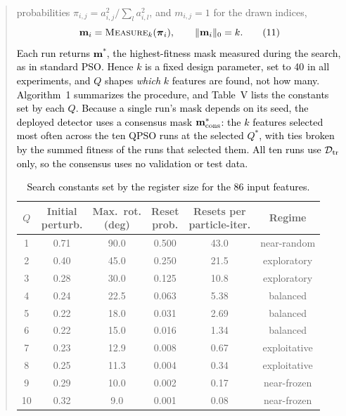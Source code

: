 \documentclass[11pt]{article}
\newenvironment{excerpt}{\begin{quote}\sloppy}{\end{quote}}
\begin{document}
\begin{excerpt}
{probabilities $\pi_{i,j}=a_{i,j}^{2}/\sum_{l}a_{i,l}^{2}$, and
$m_{i,j}=1$ for the drawn indices,}
\begin{equation}
\textcolor{black}{\mathbf{m}_i = \textsc{Measure}_k(\boldsymbol{\pi}_i),
\qquad \|\mathbf{m}_i\|_0 = k .}
\tag{11}
\end{equation}
\textcolor{black}{Each run returns $\mathbf{m}^{*}$, the
highest-fitness mask measured during the search, as in standard PSO.
Hence $k$ is a fixed design parameter, set to 40 in all experiments,
and $Q$ shapes \emph{which} $k$ features are found, not how many.
Algorithm~1 summarizes the procedure, and
Table~V lists the constants set by each $Q$.}
\textcolor{black}{Because a single run's mask depends on its
seed, the deployed detector uses a consensus mask
$\mathbf{m}^{*}_{\rm cons}$: the $k$ features selected most often
across the ten QPSO runs at the selected $Q^{*}$, with ties broken by
the summed fitness of the runs that selected them. All ten runs use
$\mathcal{D}_{\rm tr}$ only, so the consensus uses no validation or
test data.}

\setcounter{table}{4}
\begin{table}[H]
\centering
\scriptsize
\caption{\textcolor{black}{Search constants set by the
register size for the 86 input features.}}

\setlength{\tabcolsep}{4pt}
\renewcommand{\arraystretch}{1.05}
\color{black}
\begin{adjustbox}{max width=\linewidth}
\begin{tabular}{cccccc}
\hline\toprule
$Q$ & \makecell{Initial\\perturb.} & \makecell{Max.\ rot.\\(deg)} & \makecell{Reset\\prob.} & \makecell{Resets per\\particle-iter.} & Regime \\
\hline\toprule
1  & 0.71 & 90.0 & 0.500  & 43.0 & near-random \\
2  & 0.40 & 45.0 & 0.250  & 21.5 & exploratory \\
3  & 0.28 & 30.0 & 0.125  & 10.8 & exploratory \\
4  & 0.24 & 22.5 & 0.063  & 5.38 & balanced \\
5  & 0.22 & 18.0 & 0.031  & 2.69 & balanced \\
6  & 0.22 & 15.0 & 0.016  & 1.34 & balanced \\
7  & 0.23 & 12.9 & 0.008  & 0.67 & exploitative \\
8  & 0.25 & 11.3 & 0.004  & 0.34 & exploitative \\
9  & 0.29 & 10.0 & 0.002  & 0.17 & near-frozen \\
10 & 0.32 & 9.0  & 0.001  & 0.08 & near-frozen \\
\hline\toprule
\end{tabular}
\end{adjustbox}
\end{table}


\end{excerpt}
\end{document}
